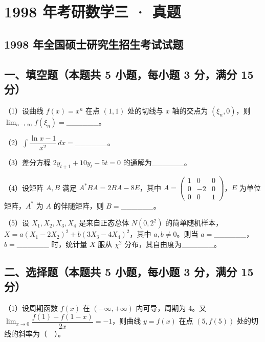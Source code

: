 \documentclass[UTF8,12pt]{ctexart}
\begin{document}
\section*{1998 年考研数学三 · 真题}
\subsection*{1998 年全国硕士研究生招生考试试题}

\subsection*{一、填空题（本题共 5 小题，每小题 3 分，满分 15 分）}

（1）设曲线 \(\displaystyle f(x)=x^n\) 在点 \(\displaystyle (1,\allowbreak 1)\) 处的切线与 \(\displaystyle x\) 轴的交点为 \(\displaystyle (\xi_n,\allowbreak 0)\)，则 \(\displaystyle \lim_{n\to\infty}f(\xi_n)=\)\_\_\_\_\_\_。


（2）\(\displaystyle \int\dfrac{\displaystyle \ln x-1}{\displaystyle x^2}\,dx=\)\_\_\_\_\_\_。


（3）差分方程 \(\displaystyle 2y_{t+1}+10y_t-5t=0\) 的通解为\_\_\_\_\_\_。


（4）设矩阵 \(\displaystyle A,\allowbreak B\) 满足 \(\displaystyle A^*BA=2BA-8E\)，其中 \(\displaystyle A=\begin{pmatrix}1&0&0\\0&-2&0\\0&0&1\end{pmatrix}\)，\(\displaystyle E\) 为单位矩阵，\(\displaystyle A^*\) 为 \(\displaystyle A\) 的伴随矩阵，则 \(\displaystyle B=\)\_\_\_\_\_\_。


（5）设 \(\displaystyle X_1,\allowbreak X_2,\allowbreak X_3,\allowbreak X_4\) 是来自正态总体 \(\displaystyle N(0,\allowbreak 2^2)\) 的简单随机样本，\(\displaystyle X=a(X_1-2X_2)^2+b(3X_3-4X_4)^2\)，其中 \(\displaystyle a,\allowbreak b\ne0\)。则当 \(\displaystyle a=\)\_\_\_\_\_\_，\(\displaystyle b=\)\_\_\_\_\_\_ 时，统计量 \(\displaystyle X\) 服从 \(\displaystyle \chi^2\) 分布，其自由度为\_\_\_\_\_\_。


\subsection*{二、选择题（本题共 5 小题，每小题 3 分，满分 15 分）}

（1）设周期函数 \(\displaystyle f(x)\) 在 \(\displaystyle (-\infty,\allowbreak +\infty)\) 内可导，周期为 4。又 \(\displaystyle \lim_{x\to0}\dfrac{\displaystyle f(1)-f(1-x)}{\displaystyle 2x}=-1\)，则曲线 \(\displaystyle y=f(x)\) 在点 \(\displaystyle (5,\allowbreak f(5))\) 处的切线的斜率为（　）。
\end{document}
